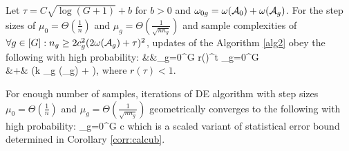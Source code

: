\begin{theorem}
	\label{theo:step}		
	Let $\tau = C\sqrt{\log(G+1)} + b$ for $b > 0$ and $\omega_{0g} = \omega({\cal A}_0) + \omega({\cal A}_g)$. For the step sizes of $\mu_0 = \Theta(\frac{1}{n})$ and $\mu_g = \Theta(\frac{1}{\sqrt{nn_g}})$ and sample complexities of $\forall g \in [G]: n_g \geq 2c_g^2 (2 \omega({\cal A}_g) + \tau)^2$, updates of the Algorithm \cref{alg2} obey the following with high probability: %
	{\small \be
	\nr
	&&\sum_{g=0}^{G}  
	\leq r(\tau)^t \sum_{g=0}^{G}     \\ \nr
	&+&   \left(\zeta k \max_{g \in [G]} \omega(\cA_g) + \tau \right),
	\ee }
	where $r(\tau) < 1$.%
	
\end{theorem}

\begin{corollary}
	\label{corr:show}
	For enough number of samples, iterations of DE algorithm with step sizes $\mu_0 = \Theta(\frac{1}{n})$ and $\mu_g =  \Theta(\frac{1}{\sqrt{n n_g}})$ geometrically converges to the following with high probability:
	{\small\be
	\label{eq:scaled}
	\sum_{g=0}^{G}  
	\leq c 
	\ee}
	which is a scaled variant of statistical error bound determined in Corollary \cref{corr:calcub}.
\end{corollary}
